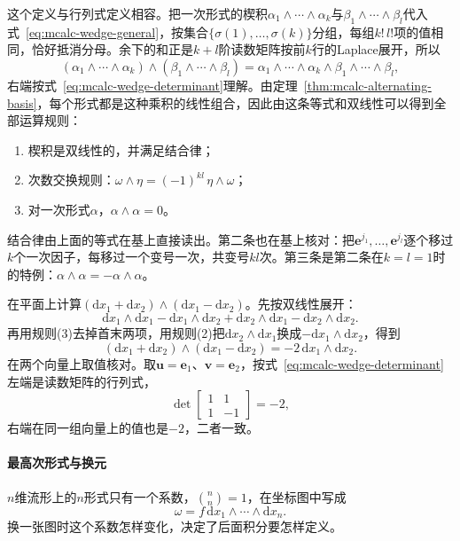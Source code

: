 这个定义与行列式定义相容。把一次形式的楔积$\alpha_1\wedge\cdots\wedge\alpha_k$与$\beta_1\wedge\cdots\wedge\beta_l$代入式~\eqref{eq:mcalc-wedge-general}，按集合$\{\sigma(1),\ldots,\sigma(k)\}$分组，每组$k!\,l!$项的值相同，恰好抵消分母。余下的和正是$k+l$阶读数矩阵按前$k$行的Laplace展开，所以
\[
(\alpha_1\wedge\cdots\wedge\alpha_k)\wedge(\beta_1\wedge\cdots\wedge\beta_l)=\alpha_1\wedge\cdots\wedge\alpha_k\wedge\beta_1\wedge\cdots\wedge\beta_l ,
\]
右端按式~\eqref{eq:mcalc-wedge-determinant}理解。由定理~\ref{thm:mcalc-alternating-basis}，每个形式都是这种乘积的线性组合，因此由这条等式和双线性可以得到全部运算规则：
\begin{enumerate}
\item 楔积是双线性的，并满足结合律；
\item 次数交换规则：$\omega\wedge\eta=(-1)^{kl}\,\eta\wedge\omega$；
\item 对一次形式$\alpha$，$\alpha\wedge\alpha=0$。
\end{enumerate}
结合律由上面的等式在基上直接读出。第二条也在基上核对：把$\bm e^{j_1},\ldots,\bm e^{j_l}$逐个移过$k$个一次因子，每移过一个变号一次，共变号$kl$次。第三条是第二条在$k=l=1$时的特例：$\alpha\wedge\alpha=-\alpha\wedge\alpha$。

\begin{example}[楔积的计算]
\label{ex:mcalc-wedge-computation}
在平面上计算$(\mathrm dx_1+\mathrm dx_2)\wedge(\mathrm dx_1-\mathrm dx_2)$。先按双线性展开：
\[
\mathrm dx_1\wedge\mathrm dx_1-\mathrm dx_1\wedge\mathrm dx_2+\mathrm dx_2\wedge\mathrm dx_1-\mathrm dx_2\wedge\mathrm dx_2 .
\]
再用规则(3)去掉首末两项，用规则(2)把$\mathrm dx_2\wedge\mathrm dx_1$换成$-\mathrm dx_1\wedge\mathrm dx_2$，得到
\[
(\mathrm dx_1+\mathrm dx_2)\wedge(\mathrm dx_1-\mathrm dx_2)=-2\,\mathrm dx_1\wedge\mathrm dx_2 .
\]
在两个向量上取值核对。取$\bm u=\bm e_1$、$\bm v=\bm e_2$，按式~\eqref{eq:mcalc-wedge-determinant}左端是读数矩阵的行列式，
\[
\det\begin{bmatrix}1&1\\1&-1\end{bmatrix}=-2 ,
\]
右端在同一组向量上的值也是$-2$，二者一致。
\end{example}

\paragraph{最高次形式与换元}
$n$维流形上的$n$形式只有一个系数，$\binom nn=1$，在坐标图中写成
\[
\omega=f\,\mathrm dx_1\wedge\cdots\wedge\mathrm dx_n .
\]
换一张图时这个系数怎样变化，决定了后面积分要怎样定义。

